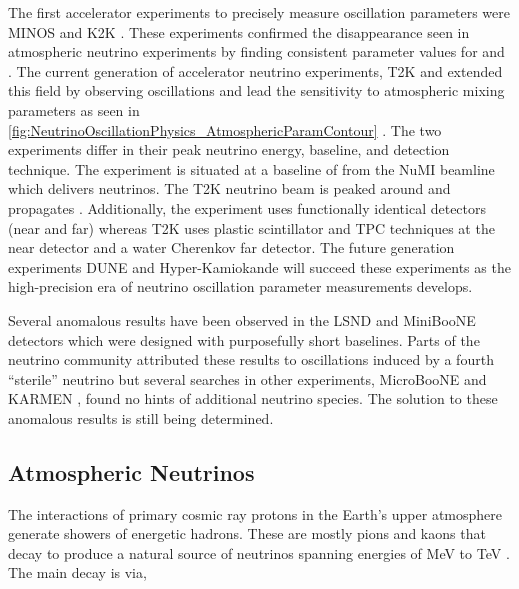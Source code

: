 The first accelerator experiments to precisely measure oscillation parameters were MINOS \cite{PhysRevLett.97.191801} and K2K \cite{k2k_obs}.
These experiments confirmed the \quickmath{\nu_{\mu}} disappearance seen in atmospheric neutrino experiments by finding consistent parameter values for  and .
The current generation of accelerator neutrino experiments, T2K and  extended this field by observing  oscillations and lead the sensitivity to atmospheric mixing parameters as seen in \autoref{fig:NeutrinoOscillationPhysics_AtmosphericParamContour} \cite{PhysRevLett.123.151803}.
The two experiments differ in their peak neutrino energy, baseline, and detection technique.
The  experiment is situated at a baseline of  from the NuMI beamline which delivers  neutrinos.
The T2K neutrino beam is peaked around  and propagates  \cite{t2k_det}.
Additionally, the  experiment uses functionally identical detectors (near and far) whereas T2K uses plastic scintillator and TPC techniques at the near detector and a water Cherenkov far detector.
The future generation experiments DUNE \cite{Abi2020-cm} and Hyper-Kamiokande \cite{Hyper-Kamiokande_Proto-Collaboration2015-ac} will succeed these experiments as the high-precision era of neutrino oscillation parameter measurements develops.

Several anomalous results have been observed in the LSND \cite{PhysRevD.64.112007} and MiniBooNE \cite{PhysRevLett.110.161801} detectors which were designed with purposefully short baselines. Parts of the neutrino community attributed these results to oscillations induced by a fourth ``sterile'' neutrino \cite{Blanco_2020} but several searches in other experiments, MicroBooNE \cite{10.48550/arxiv.2110.14054} and KARMEN \cite{PhysRevD.65.112001}, found no hints of additional neutrino species. The solution to these anomalous results is still being determined.

\subsection{Atmospheric Neutrinos}
\label{subsec:NeutrinoOscillationPhysics_AtmosphericNeutrinos}

The interactions of primary cosmic ray protons in the Earth's upper atmosphere generate showers of energetic hadrons. These are mostly pions and kaons that decay to produce a natural source of neutrinos spanning energies of MeV to TeV \cite{Gaisser2002-gl}. The main decay is via,

